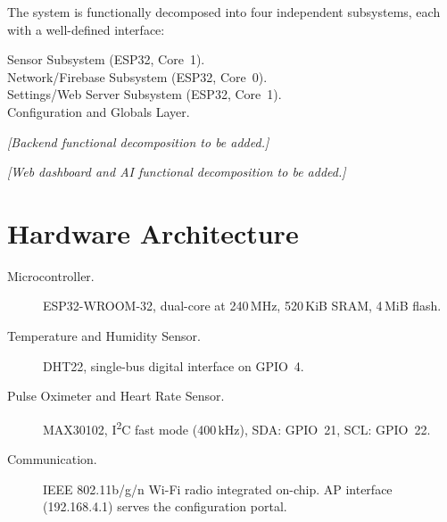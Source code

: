 The system is functionally decomposed into four independent subsystems, each with a
well-defined interface:

\begin{description}
	\item[Sensor Subsystem (ESP32, Core~1).]
	\item[Network/Firebase Subsystem (ESP32, Core~0).]
	\item[Settings/Web Server Subsystem (ESP32, Core~1).]
	\item[Configuration and Globals Layer.]
\end{description}

\begin{center}
	\textit{[Backend functional decomposition to be added.]}
\end{center}

\begin{center}
	\textit{[Web dashboard and AI functional decomposition to be added.]}
\end{center}

\section{Hardware Architecture}

\begin{description}
	\item[Microcontroller.]
	      ESP32-WROOM-32, dual-core at 240\,MHz,
	      520\,KiB SRAM, 4\,MiB flash.

	\item[Temperature and Humidity Sensor.]
	      DHT22, single-bus digital interface on GPIO~4.

	\item[Pulse Oximeter and Heart Rate Sensor.]
	      MAX30102, I\textsuperscript{2}C fast mode (400\,kHz), SDA: GPIO~21,
	      SCL: GPIO~22.

	\item[Communication.]
	      IEEE 802.11b/g/n Wi-Fi radio integrated on-chip.
	      AP interface (192.168.4.1) serves the configuration portal.
\end{description}

